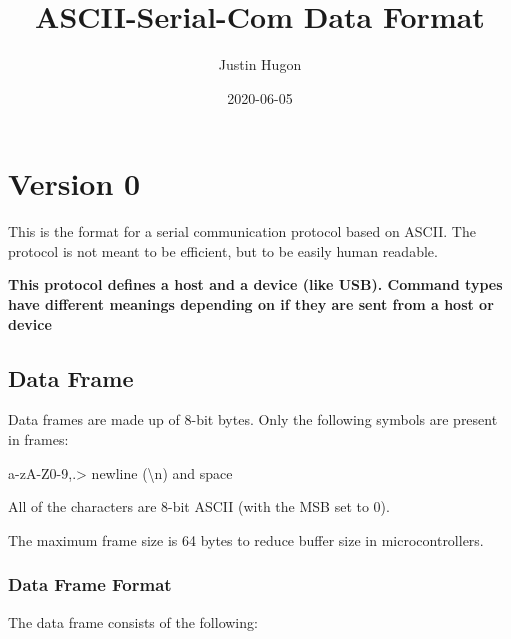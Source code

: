 \documentclass{customdocclass}
\title{ASCII-Serial-Com Data Format}
\author{Justin Hugon}
\date{2020-06-05}
\begin{document}
\maketitle

\section{Version 0}


This is the format for a serial communication protocol based on ASCII. The
protocol is not meant to be efficient, but to be easily human readable.

\textbf{This protocol defines a host and a device (like USB). Command types
have different meanings depending on if they are sent from a host or device}

\subsection{Data Frame}

Data frames are made up of 8-bit bytes. Only the following symbols are present in frames:

\vspace{1em}

a-zA-Z0-9,.> newline (\textbackslash n) and space

\vspace{1em}

All of the characters are 8-bit ASCII (with the MSB set to 0).

The maximum frame size is 64 bytes to reduce buffer size in microcontrollers.

\subsubsection{Data Frame Format}

The data frame consists of the following:
\end{document}
